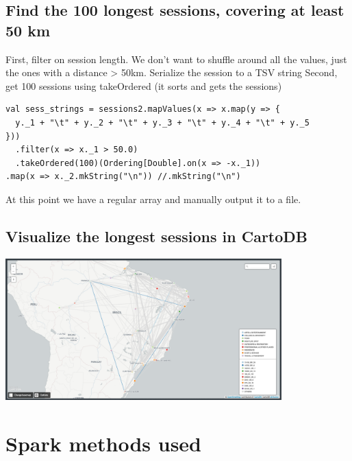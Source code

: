 \documentclass[abstract=on]{article}
\begin{document}
\subsection{Find the 100 longest sessions, covering at least 50 km}
First, filter on session length. We don't want to shuffle around all the values, just the ones with a distance > 50km.
Serialize the session to a TSV string
Second, get 100 sessions using takeOrdered (it sorts and gets the sessions)
\begin{lstlisting}
val sess_strings = sessions2.mapValues(x => x.map(y => {
  y._1 + "\t" + y._2 + "\t" + y._3 + "\t" + y._4 + "\t" + y._5
}))
  .filter(x => x._1 > 50.0)
  .takeOrdered(100)(Ordering[Double].on(x => -x._1))
.map(x => x._2.mkString("\n")) //.mkString("\n")
\end{lstlisting}
At this point we have a regular array and manually output it to a file.


\subsection{Visualize the longest sessions in CartoDB}
\begin{center}
\includegraphics[width=0.8\textwidth]{carto.png}
\end{center}

\section{Spark methods used}
\end{document}
